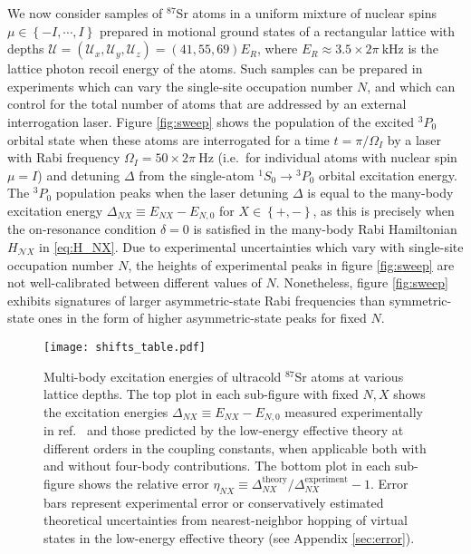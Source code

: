 \documentclass[preprint,showkeys,nofootinbib]{revtex4-1}
\renewcommand{\t}{\text} %
\newcommand{\p}[1]{\left(#1\right)} %
\renewcommand{\set}[1]{\left\{#1\right\}} %
\newcommand{\N}{\mathcal{N}}
\newcommand{\U}{\mathcal{U}}
\newcommand{\1}{\mathds{1}}
\begin{document}
We now consider samples of ${}^{87}$Sr atoms in a uniform mixture of
nuclear spins $\mu\in\set{-I,\cdots,I}$ prepared in motional ground
states of a rectangular lattice with depths
$\U=\p{\U_x,\U_y,\U_z}=\p{41,55,69}E_R$, where
$E_R\approx3.5\times2\pi~\t{kHz}$ is the lattice photon recoil energy
of the atoms.  Such samples can be prepared in experiments which can
vary the single-site occupation number $N$, and which can control for
the total number of atoms that are addressed by an external
interrogation laser.  Figure \ref{fig:sweep} shows the population of
the excited ${}^3P_0$ orbital state when these atoms are interrogated
for a time $t=\pi/\Omega_I$ by a laser with Rabi frequency
$\Omega_I=50\times2\pi~\t{Hz}$ (i.e.~for individual atoms with nuclear
spin $\mu=I$) and detuning $\Delta$ from the single-atom
${}^1S_0\to{}^3P_0$ orbital excitation energy.  The ${}^3P_0$
population peaks when the laser detuning $\Delta$ is equal to the
many-body excitation energy $\Delta_{NX}\equiv E_{NX}-E_{N,0}$ for
$X\in\set{+,-}$, as this is precisely when the on-resonance condition
$\delta=0$ is satisfied in the many-body Rabi Hamiltonian $H_{\N X}$
in \eqref{eq:H_NX}.  Due to experimental uncertainties which vary with
single-site occupation number $N$, the heights of experimental peaks
in figure \ref{fig:sweep} are not well-calibrated between different
values of $N$.  Nonetheless, figure \ref{fig:sweep} exhibits
signatures of larger asymmetric-state Rabi frequencies than
symmetric-state ones in the form of higher asymmetric-state peaks for
fixed $N$.

\begin{figure}
  \centering
  \texttt{[image: shifts\_table.pdf]}
  \caption{\footnotesize Multi-body excitation energies of ultracold
    ${}^{87}$Sr atoms at various lattice depths.  The top plot in each
    sub-figure with fixed $N,X$ shows the excitation energies
    $\Delta_{NX}\equiv E_{NX}-E_{N,0}$ measured experimentally in
    ref.~\cite{goban2018emergence} and those predicted by the
    low-energy effective theory at different orders in the coupling
    constants, when applicable both with and without four-body
    contributions.  The bottom plot in each sub-figure shows the
    relative error
    $\eta_{NX}\equiv
    \Delta_{NX}^{\t{theory}}/\Delta_{NX}^{\t{experiment}}-1$.  Error
    bars represent experimental error or conservatively estimated
    theoretical uncertainties from nearest-neighbor hopping of virtual
    states in the low-energy effective theory (see Appendix
    \ref{sec:error}).}
  \label{fig:shifts}
\end{figure}
\end{document}
